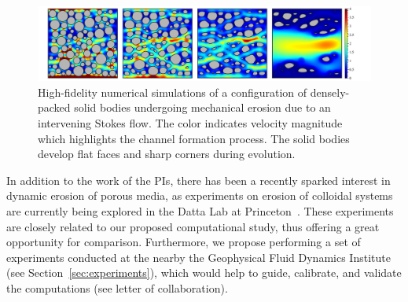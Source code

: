 \documentclass[11pt]{article}
\begin{document}
\begin{figure}%
\begin{center}
\includegraphics[width = 0.99 \textwidth]{./figs/80circ8vel.pdf}
\caption{\label{80circ8vel} High-fidelity numerical simulations of a configuration of densely-packed solid bodies undergoing mechanical erosion due to an intervening Stokes flow. The color indicates velocity magnitude which highlights the channel formation process. The solid bodies develop flat faces and sharp corners during evolution. }
\end{center}
\end{figure}
 
 
	In addition to the work of the PIs, there has been a recently sparked interest in dynamic erosion of porous media, as experiments on erosion of colloidal systems are currently being explored in the Datta Lab at Princeton~\cite{bizmark2019multiscale}. These experiments are closely related to our proposed computational study, thus offering a great opportunity for comparison. Furthermore, we propose performing a set of experiments conducted at the nearby the Geophysical Fluid Dynamics Institute (see Section~\ref{sec:experiments}), which would help to guide, calibrate, and validate the computations (see letter of collaboration).
\end{document}
